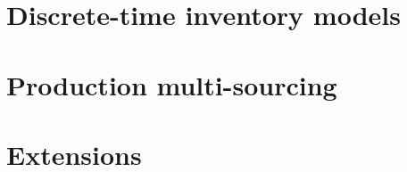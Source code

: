 
\cleardoublepage
\part{Discrete-time inventory models}
\label{part:production planning}





\cleardoublepage
\part{Production multi-sourcing}
\label{part:multi-sourcing}

 
 


\cleardoublepage
\part{Extensions}
\label{part:extensions}


 


\cleardoublepage
{}







\cleardoublepage
{}






\appendix


\cleardoublepage

% 
% 




